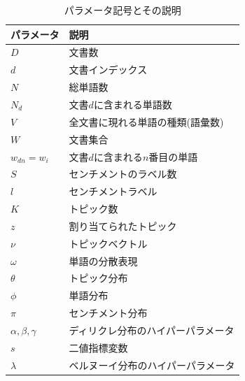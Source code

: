 \documentclass[uplatex]{jsarticle}
\begin{document}
\begin{table}[tbp]
    \caption{パラメータ記号とその説明}
    \centering
    \begin{tabular}{ll}
        \hline
        パラメータ            & 説明                               \\
        \hline \hline
        $D$                   & 文書数                             \\
        $d$                   & 文書インデックス                   \\
        $N$                   & 総単語数                           \\
        $N_{d}$               & 文書$d$に含まれる単語数            \\
        $V$                   & 全文書に現れる単語の種類(語彙数)   \\
        $W$                   & 文書集合                           \\
        $w_{dn} = w_{i}$      & 文書$d$に含まれる$n$番目の単語     \\
        $S$                   & センチメントのラベル数             \\
        $l$                   & センチメントラベル                 \\
        $K$                   & トピック数                         \\
        $z$                   & 割り当てられたトピック             \\
        $\nu$                 & トピックベクトル                   \\
        $\omega$              & 単語の分散表現                     \\
        $\theta$              & トピック分布                       \\
        $\phi$                & 単語分布                           \\
        $\pi$                 & センチメント分布                   \\
        $\alpha,\beta,\gamma$ & ディリクレ分布のハイパーパラメータ \\
        $s$                   & 二値指標変数                       \\
        $\lambda$             & ベルヌーイ分布のハイパーパラメータ \\
        \hline
    \end{tabular}
\end{table}
\end{document}
